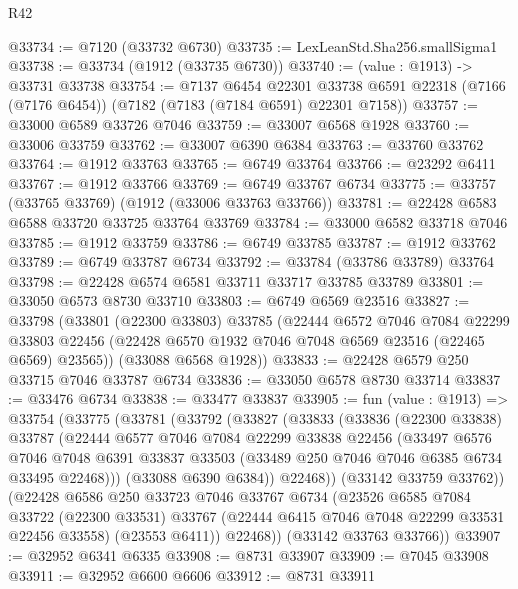 \begin{lexlean}{R42}
\begin{coremodule}
{@33734 := @7120 (@33732 @6730)
@33735 := LexLeanStd.Sha256.smallSigma1
@33738 := @33734 (@1912 (@33735 @6730))
@33740 := (value : @1913) -> @33731 @33738
@33754 := @7137
    @6454
    @22301
    @33738
    @6591
    @22318
    (@7166 (@7176 @6454))
    (@7182 (@7183 (@7184 @6591) @22301 @7158))
@33757 := @33000 @6589 @33726 @7046
@33759 := @33007 @6568 @1928
@33760 := @33006 @33759
@33762 := @33007 @6390 @6384
@33763 := @33760 @33762
@33764 := @1912 @33763
@33765 := @6749 @33764
@33766 := @23292 @6411
@33767 := @1912 @33766
@33769 := @6749 @33767 @6734
@33775 := @33757 (@33765 @33769) (@1912 (@33006 @33763 @33766))
@33781 := @22428 @6583 @6588 @33720 @33725 @33764 @33769
@33784 := @33000 @6582 @33718 @7046
@33785 := @1912 @33759
@33786 := @6749 @33785
@33787 := @1912 @33762
@33789 := @6749 @33787 @6734
@33792 := @33784 (@33786 @33789) @33764
@33798 := @22428 @6574 @6581 @33711 @33717 @33785 @33789
@33801 := @33050 @6573 @8730 @33710
@33803 := @6749 @6569 @23516
@33827 := @33798
    (@33801
      (@22300 @33803)
      @33785
      (@22444
        @6572
        @7046
        @7084
        @22299
        @33803
        @22456
        (@22428 @6570 @1932 @7046 @7048 @6569 @23516 (@22465 @6569) @23565))
      (@33088 @6568 @1928))
@33833 := @22428 @6579 @250 @33715 @7046 @33787 @6734
@33836 := @33050 @6578 @8730 @33714
@33837 := @33476 @6734
@33838 := @33477 @33837
@33905 := fun (value : @1913) =>
  @33754
    (@33775
      (@33781
        (@33792
          (@33827
            (@33833
              (@33836
                (@22300 @33838)
                @33787
                (@22444
                  @6577
                  @7046
                  @7084
                  @22299
                  @33838
                  @22456
                  (@33497
                    @6576
                    @7046
                    @7048
                    @6391
                    @33837
                    @33503
                    (@33489 @250 @7046 @7046 @6385 @6734 @33495 @22468)))
                (@33088 @6390 @6384))
              @22468))
          (@33142 @33759 @33762))
        (@22428
          @6586
          @250
          @33723
          @7046
          @33767
          @6734
          (@23526
            @6585
            @7084
            @33722
            (@22300 @33531)
            @33767
            (@22444 @6415 @7046 @7048 @22299 @33531 @22456 @33558)
            (@23553 @6411))
          @22468))
      (@33142 @33763 @33766))
@33907 := @32952 @6341 @6335
@33908 := @8731 @33907
@33909 := @7045 @33908
@33911 := @32952 @6600 @6606
@33912 := @8731 @33911
}
\end{coremodule}
\end{lexlean}
